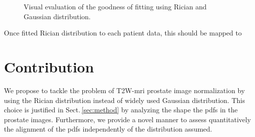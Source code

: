 \begin{figure}
  \centering
  \hfill
  \hfill
  \caption{Visual evaluation of the goodness of fitting using Rician and Gaussian distribution.}
  \label{fig:fitting}
\end{figure}

Once fitted Rician distribution to each patient data, this should be mapped to 
\section{Contribution}

We propose to tackle the problem of T2W-\ac{mri} prostate image normalization by using the Rician distribution instead of widely used Gaussian distribution. This choice is justified in Sect.\,\ref{sec:method} by analyzing the shape the \ac{pdf}s in the prostate images. Furthermore, we provide a novel manner to assess quantitatively the alignment of the \ac{pdf}s independently of the distribution assumed. 


